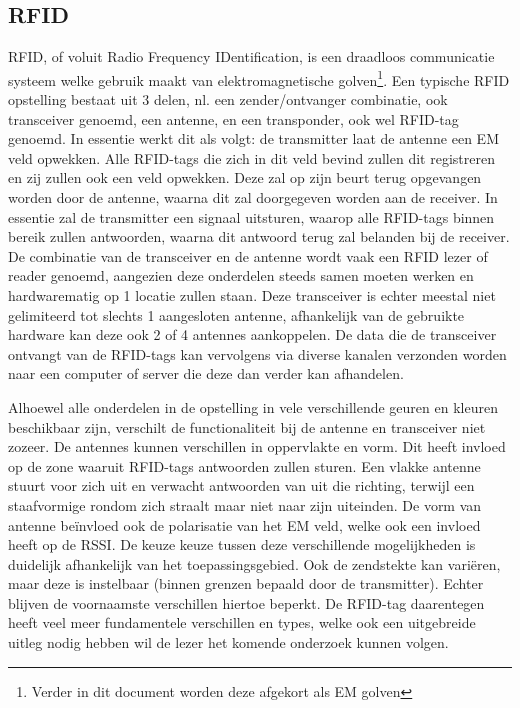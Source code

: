\subsection{RFID}
\label{subsec:lit-rfid}
RFID, of voluit Radio Frequency IDentification, is een draadloos communicatie systeem welke gebruik maakt van elektromagnetische golven\footnote{Verder in dit document worden deze afgekort als EM golven}. Een typische RFID opstelling bestaat uit 3 delen, nl. een zender/ontvanger combinatie, ook transceiver genoemd, een antenne, en een transponder, ook wel RFID-tag  genoemd.\autocite{Auxcis2022}\autocite{SICK2022} In essentie werkt dit als volgt: de transmitter laat de antenne een EM veld opwekken. Alle RFID-tags die zich in dit veld bevind zullen dit registreren en zij zullen ook een veld opwekken. Deze zal op zijn beurt terug opgevangen worden door de antenne, waarna dit zal doorgegeven worden aan de receiver.
In essentie zal de transmitter een signaal uitsturen, waarop alle RFID-tags binnen bereik zullen antwoorden, waarna dit antwoord terug zal belanden bij de receiver. De combinatie van de transceiver en de antenne wordt vaak een RFID lezer of reader genoemd, aangezien deze onderdelen steeds samen moeten werken en hardwarematig op 1 locatie zullen staan.\autocite{Amster2021}
Deze transceiver is echter meestal niet gelimiteerd tot slechts 1 aangesloten antenne, afhankelijk van de gebruikte hardware kan deze ook 2 of 4 antennes aankoppelen. De data die de transceiver ontvangt van de RFID-tags kan vervolgens via diverse kanalen verzonden worden naar een computer of server die deze dan verder kan afhandelen.

Alhoewel alle onderdelen in de opstelling in vele verschillende geuren en kleuren beschikbaar zijn, verschilt de functionaliteit bij de antenne en transceiver niet zozeer. De antennes kunnen verschillen in oppervlakte en vorm. Dit heeft invloed op de zone waaruit RFID-tags antwoorden zullen sturen. Een vlakke antenne stuurt voor zich uit en verwacht antwoorden van uit die richting, terwijl een staafvormige rondom zich straalt maar niet naar zijn uiteinden. De vorm van antenne beïnvloed ook de polarisatie van het EM veld, welke ook een invloed heeft op de RSSI. De keuze keuze tussen deze verschillende mogelijkheden is duidelijk afhankelijk van het toepassingsgebied. Ook de zendstekte kan variëren, maar deze is instelbaar (binnen grenzen bepaald door de transmitter). Echter blijven de voornaamste verschillen hiertoe beperkt. De RFID-tag daarentegen heeft veel meer fundamentele verschillen en types, welke ook een uitgebreide uitleg nodig hebben wil de lezer het komende onderzoek kunnen volgen.


